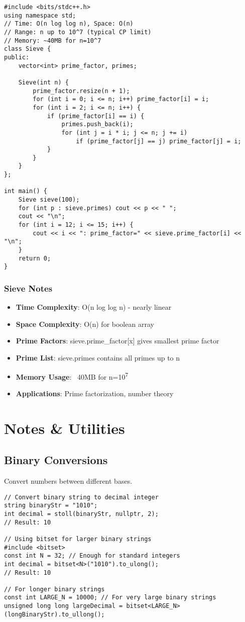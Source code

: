 \documentclass[11pt,a4paper]{article}
\begin{document}
\begin{lstlisting}[caption={Sieve of Eratosthenes}]
#include <bits/stdc++.h>
using namespace std;
// Time: O(n log log n), Space: O(n)
// Range: n up to 10^7 (typical CP limit)
// Memory: ~40MB for n=10^7
class Sieve {
public:
    vector<int> prime_factor, primes;
    
    Sieve(int n) {
        prime_factor.resize(n + 1);
        for (int i = 0; i <= n; i++) prime_factor[i] = i;
        for (int i = 2; i <= n; i++) {
            if (prime_factor[i] == i) {
                primes.push_back(i);
                for (int j = i * i; j <= n; j += i)
                    if (prime_factor[j] == j) prime_factor[j] = i;
            }
        }
    }
};

int main() {
    Sieve sieve(100);
    for (int p : sieve.primes) cout << p << " ";
    cout << "\n";
    for (int i = 12; i <= 15; i++) {
        cout << i << ": prime_factor=" << sieve.prime_factor[i] << "\n";
    }  
    return 0;
}
\end{lstlisting}

\subsubsection*{Sieve Notes}
\begin{itemize}
\item \textbf{Time Complexity}: O(n log log n) - nearly linear
\item \textbf{Space Complexity}: O(n) for boolean array
\item \textbf{Prime Factors}: sieve.prime\_factor[x] gives smallest prime factor
\item \textbf{Prime List}: sieve.primes contains all primes up to n
\item \textbf{Memory Usage}: ~40MB for n=10\textsuperscript{7}
\item \textbf{Applications}: Prime factorization, number theory
\end{itemize}

\newpage
\section{Notes \& Utilities}

\subsection{Binary Conversions}
Convert numbers between different bases.

\begin{lstlisting}[caption={Binary to Decimal Conversion}]
// Convert binary string to decimal integer
string binaryStr = "1010";
int decimal = stoll(binaryStr, nullptr, 2);
// Result: 10

// Using bitset for larger binary strings
#include <bitset>
const int N = 32; // Enough for standard integers
int decimal = bitset<N>("1010").to_ulong();
// Result: 10

// For longer binary strings
const int LARGE_N = 10000; // For very large binary strings
unsigned long long largeDecimal = bitset<LARGE_N>(longBinaryStr).to_ullong();
\end{lstlisting}
\end{document}
